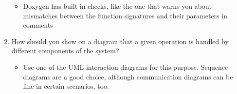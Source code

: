 \begin{enumerate}
\begin{itemize}
\item 
Doxygen has built-in checks, like the one that warns you about mismatches between the function signatures and their parameters in comments
\end{itemize}

\item
How should you show on a diagram that a given operation is handled by different components of the system?

\begin{itemize}
\item 
Use one of the UML interaction diagrams for this purpose. Sequence diagrams are a good choice, although communication diagrams can be fine in certain scenarios, too.
\end{itemize}

\end{enumerate}
